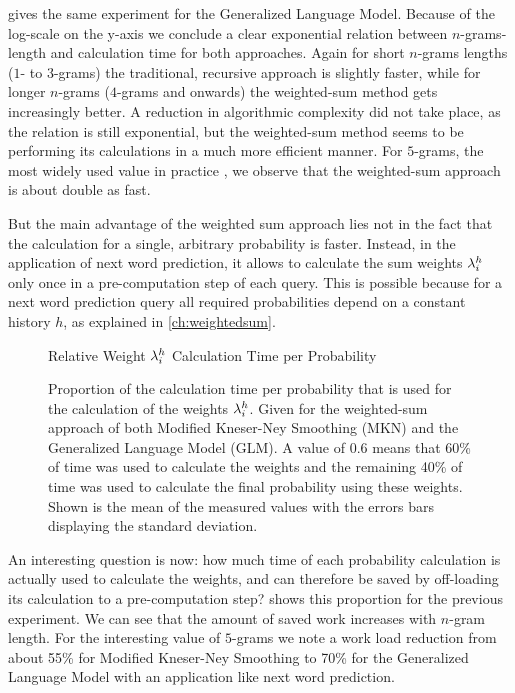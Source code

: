  gives the same experiment for the Generalized
Language Model.
Because of the log-scale on the y-axis we conclude a clear exponential relation
between $n$-grams-length and calculation time for both approaches.
Again for short $n$-grams lengths ($1$- to $3$-grams) the traditional, recursive
approach is slightly faster, while for longer $n$-grams ($4$-grams and onwards)
the weighted-sum method gets increasingly better.
A reduction in algorithmic complexity did not take place, as the relation is
still exponential, but the weighted-sum method seems to be performing its
calculations in a much more efficient manner.
For $5$-grams, the most widely used value in practice
\parencite{JurafskyMartin2009,Goodman2001,Stolcke2000}, we observe that the
weighted-sum approach is about double as fast.

But the main advantage of the weighted sum approach lies not in the fact
that the calculation for a single, arbitrary probability is faster.
Instead, in the application of next word prediction, it allows to calculate the
sum weights $\lambda^h_i$ only once in a pre-computation step of each query.
This is possible because for a next word prediction query all required
probabilities depend on a constant history $h$, as explained in
\cref{ch:weightedsum}.

\begin{figure}
  \centering
  Relative Weight $\lambda^h_i$ Calculation Time per Probability
  \\[1.5ex]
  \begin{minipage}{0.7\textwidth}
    \centering
    
  \end{minipage}
  \caption{Proportion of the calculation time per probability that is used
    for the calculation of the weights $\lambda^h_i$.
    Given for the weighted-sum approach of both Modified Kneser-Ney Smoothing
    (MKN) and the Generalized Language Model (GLM).
    A value of \num{0.6} means that 60\% of time
    was used to calculate the weights and the remaining 40\% of time was used
    to calculate the final probability using these weights.
    Shown is the mean of the measured values with the errors bars displaying the
    standard deviation.}
  \label{fig:evaluation-weight-times}
\end{figure}

An interesting question is now: how much time of each probability calculation
is actually used to calculate the weights, and can therefore be saved by
off-loading its calculation to a pre-computation step?
 shows this proportion for the previous
experiment.
We can see that the amount of saved work increases with $n$-gram length.
For the interesting value of $5$-grams we note a work load reduction from
about 55\% for Modified Kneser-Ney Smoothing to 70\% for the Generalized
Language Model with an application like next word prediction.

